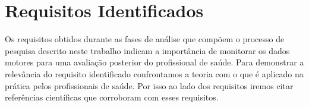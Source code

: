 \section{Requisitos Identificados}


Os requisitos obtidos durante as fases de análise que compõem o processo de pesquisa descrito neste trabalho indicam a importância de monitorar os dados motores para uma avaliação posterior do profissional de saúde.
Para demonstrar a relevância do requisito identificado confrontamos a teoria com o que é aplicado na prática pelos profissionais de saúde. Por isso ao lado dos requisitos iremos citar referências científicas que corroboram com esses requisitos. 

